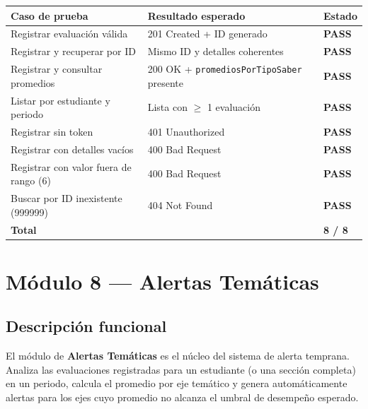 \documentclass[11pt,a4paper,oneside]{article}
\newcommand{\code}[1]{\texttt{\small #1}}
\newcommand{\pass}{\textbf{\color{ataraVerde}PASS}}
\begin{document}
\begin{table}[h]\centering\small\renewcommand{\arraystretch}{1.15}
\begin{tabular}{@{}p{6.5cm} p{5.5cm} p{1.4cm}@{}}
\toprule
\textbf{Caso de prueba} & \textbf{Resultado esperado} & \textbf{Estado} \\
\midrule
Registrar evaluación válida                       & 201 Created + ID generado                & \pass \\
Registrar y recuperar por ID                      & Mismo ID y detalles coherentes           & \pass \\
Registrar y consultar promedios                   & 200 OK + \code{promediosPorTipoSaber} presente & \pass \\
Listar por estudiante y periodo                   & Lista con $\geq$ 1 evaluación             & \pass \\
Registrar sin token                               & 401 Unauthorized                         & \pass \\
Registrar con detalles vacíos                     & 400 Bad Request                          & \pass \\
Registrar con valor fuera de rango (6)            & 400 Bad Request                          & \pass \\
Buscar por ID inexistente (999999)                & 404 Not Found                            & \pass \\
\midrule
\textbf{Total}                                    &                                          & \textbf{8 / 8} \\
\bottomrule
\end{tabular}
\end{table}

\section{Módulo 8 — Alertas Temáticas}

\subsection{Descripción funcional}

El módulo de \textbf{Alertas Temáticas} es el núcleo del sistema de alerta temprana. Analiza
las evaluaciones registradas para un estudiante (o una sección completa) en un periodo,
calcula el promedio por eje temático y genera automáticamente alertas para los ejes cuyo
promedio no alcanza el umbral de desempeño esperado.
\end{document}
